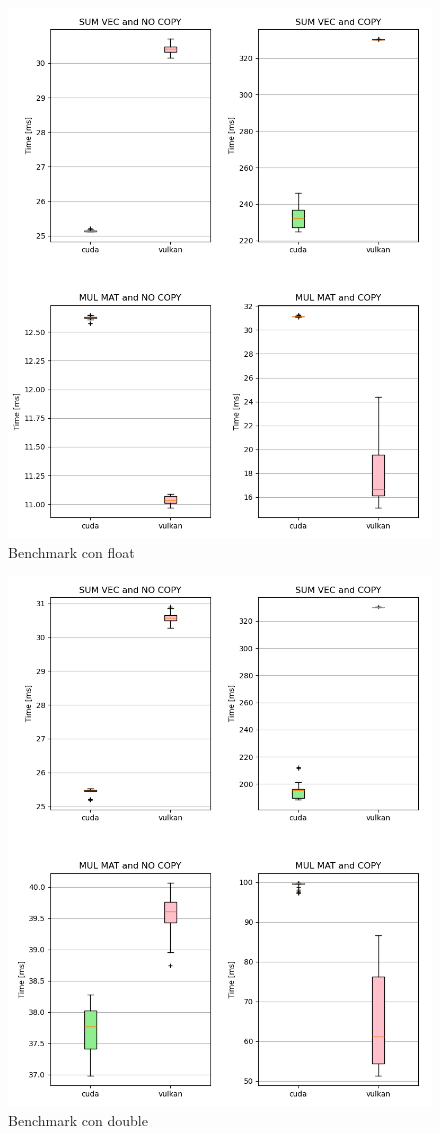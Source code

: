 \begin{figure}[ht]
  \centering
  \includegraphics[width=1\linewidth]{images/chapter4/bench_f32.png}
  \caption{Benchmark con float}
  \label{fig:bench_f32}
\end{figure}

\begin{figure}[ht]
  \centering
  \includegraphics[width=1\linewidth]{images/chapter4/bench_f64.png}
  \caption{Benchmark con double}
  \label{fig:bench_f64}
\end{figure}
